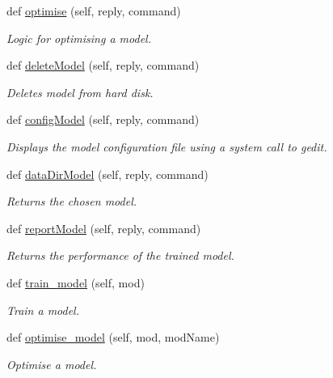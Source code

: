 \begin{DoxyCompactItemize}
def \hyperlink{group__icubclient__SAM__Core_a78a19d8b34c5f62c2d6b52aedfe8d937}{optimise} (self, reply, command)
\begin{DoxyCompactList}\small\item\em Logic for optimising a model. \end{DoxyCompactList}\item 
def \hyperlink{group__icubclient__SAM__Core_a01051c2ab9e4f136dd85dfe420974c6e}{delete\+Model} (self, reply, command)
\begin{DoxyCompactList}\small\item\em Deletes model from hard disk. \end{DoxyCompactList}\item 
def \hyperlink{group__icubclient__SAM__Core_adb7d75e58edc8d351d383a72250f2b48}{config\+Model} (self, reply, command)
\begin{DoxyCompactList}\small\item\em Displays the model configuration file using a system call to gedit. \end{DoxyCompactList}\item 
def \hyperlink{group__icubclient__SAM__Core_a1e4835426aa35b8e5c8a799d1d42140a}{data\+Dir\+Model} (self, reply, command)
\begin{DoxyCompactList}\small\item\em Returns the chosen model. \end{DoxyCompactList}\item 
def \hyperlink{group__icubclient__SAM__Core_a810140960cafeed884a09f69ec5f6025}{report\+Model} (self, reply, command)
\begin{DoxyCompactList}\small\item\em Returns the performance of the trained model. \end{DoxyCompactList}\item 
def \hyperlink{group__icubclient__SAM__Core_abf80e9a30f9625803bea1c5f70a670bc}{train\+\_\+model} (self, mod)
\begin{DoxyCompactList}\small\item\em Train a model. \end{DoxyCompactList}\item 
def \hyperlink{group__icubclient__SAM__Core_a28979a7200a6e5237947b24683ca4a6e}{optimise\+\_\+model} (self, mod, mod\+Name)
\begin{DoxyCompactList}\small\item\em Optimise a model. \end{DoxyCompactList}\item 

\end{DoxyCompactItemize}
